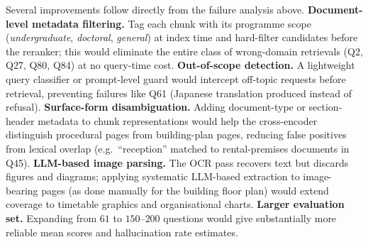 \documentclass[fleqn,moreauthors,10pt]{ds_report}
\begin{document}
Several improvements follow directly from the failure analysis above. \textbf{Document-level metadata filtering.} Tag each chunk with its programme scope (\emph{undergraduate}, \emph{doctoral}, \emph{general}) at index time and hard-filter candidates before the reranker; this would eliminate the entire class of wrong-domain retrievals (Q2, Q27, Q80, Q84) at no query-time cost. \textbf{Out-of-scope detection.} A lightweight query classifier or prompt-level guard would intercept off-topic requests before retrieval, preventing failures like Q61 (Japanese translation produced instead of refusal). \textbf{Surface-form disambiguation.} Adding document-type or section-header metadata to chunk representations would help the cross-encoder distinguish procedural pages from building-plan pages, reducing false positives from lexical overlap (e.g.\ ``reception'' matched to rental-premises documents in Q45). \textbf{LLM-based image parsing.} The OCR pass recovers text but discards figures and diagrams; applying systematic LLM-based extraction to image-bearing pages (as done manually for the building floor plan) would extend coverage to timetable graphics and organisational charts. \textbf{Larger evaluation set.} Expanding from $61$ to $150$--$200$ questions would give substantially more reliable mean scores and hallucination rate estimates.
\end{document}
